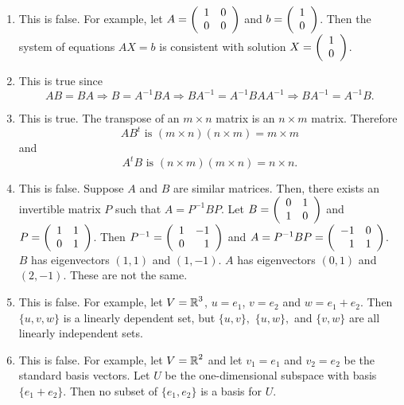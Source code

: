\documentclass{ximera}
\begin{document}
\begin{exercise}
\begin{solution}
\soln \begin{enumerate}[label=(\alph*)]
\item This is false. For example, let $A=\left(\begin{array}{rrrrrrrrrrrrrrrrrr} 1 & 0 \\ 0 & 0 \end{array}\right)$ and $b=\left(\begin{array}{rrrrrrrrrrrrrrrrrr} 1\\0 \end{array}\right)$. Then the system of equations $AX=b$ is consistent with solution $X=\left(\begin{array}{rrrrrrrrrrrrrrrrrr} 1\\0 \end{array}\right)$. 
\item This is true since
\[ 
AB = BA \Longrightarrow B = A^{-1}BA \Longrightarrow BA^{-1} = A^{-1}BAA^{-1} \Longrightarrow BA^{-1} = A^{-1}B.
\]
\item This is true.  The transpose of an $m\times n$ matrix is an $n\times m$ matrix. Therefore 
\[
AB^t \mbox{ is }  (m\times n)(n\times m) = m\times m
\]
and
\[
A^tB \mbox{ is }  (n\times m)(m\times n) = n\times n.
\]

\item This is false. Suppose $A$ and $B$ are similar matrices. Then, there exists an invertible matrix $P$ such that $A=P^{-1}BP$. Let $B=\left(\begin{array}{rrrrrrrrrrrrrrrrrr}  0 & 1 \\ 1 & 0 \end{array}\right)$ and $P=\left(\begin{array}{rrrrrrrrrrrrrrrrrr}  1 & 1 \\ 0 & 1 \end{array}\right)$. Then $P^{-1}=\left(\begin{array}{rrrrrrrrrrrrrrrrrr}  1 & -1 \\ 0 & 1 \end{array}\right)$ and $A=P^{-1}BP=\left(\begin{array}{rrrrrrrrrrrrrrrrrr}  -1 & 0 \\ 1 & 1 \end{array}\right)$. $B$ has eigenvectors $(1,1)$ and $(1,-1)$. $A$ has eigenvectors $(0,1)$ and $(2,-1)$. These are not the same. 

\item This is false. For example, let $V=\mbox{$\mathbb{R}$}^3$, $u=e_1$, $v=e_2$ and $w=e_1+e_2$. Then $\{u,v,w\}$ is a linearly dependent set, but $\{u,v\},$ $\{u,w\},$ and $\{v,w\}$ are all linearly independent sets.

\item This is false. For example, let $V=\mbox{$\mathbb{R}$}^2$ and let $v_1=e_1$ and $v_2=e_2$ be the standard basis vectors. Let $U$ be the one-dimensional subspace with basis $\{e_1+e_2\}$. Then no subset of $\{e_1,e_2\}$ is a basis for $U$.
\end{enumerate}
\end{solution}
\end{exercise}
\end{document}

